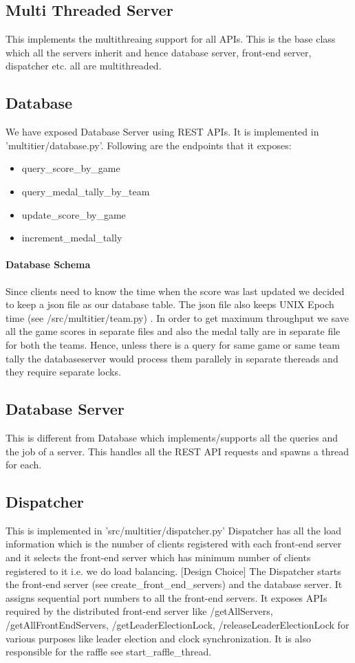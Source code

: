 \documentclass{article}
\begin{document}
\subsection{Multi Threaded Server}
This implements the multithreaing support for all APIs. This is the base class which all the servers inherit and hence database server, front-end server, dispatcher etc. all are multithreaded.

\subsection{Database}
We have exposed Database Server using REST APIs. 
It is implemented in 'multitier/database.py'.
Following are the endpoints that it exposes:
\begin{itemize}
\item query\_score\_by\_game
\item query\_medal\_tally\_by\_team
\item update\_score\_by\_game
\item increment\_medal\_tally
\end{itemize}

\paragraph{Database Schema}
Since clients need to know the time when the score was last updated we 
decided to keep a json file as our database table. The json file also keeps
UNIX Epoch time (see /src/multitier/team.py) . In order to get  maximum throughput we save all the game scores in separate files and also the medal tally are in separate file for both the teams. Hence, unless there is a query for same game or same team tally the databaseserver would process them parallely in separate thereads and they require separate locks.


\subsection{Database Server}
This is different from Database which implements/supports all the queries and the job of a server. This handles all the REST API requests and spawns a thread for each.

\subsection{Dispatcher}
This is implemented in 'src/multitier/dispatcher.py' Dispatcher has all the load information which is the number of clients registered with each front-end server and it selects the front-end server which has minimum number of clients registered to it i.e. we do load balancing. [Design Choice] The Dispatcher starts the front-end server (see create\_front\_end\_servers) and the database server. It assigns sequential port numbers to all the front-end servers. It exposes APIs required by the distributed front-end server like /getAllServers, /getAllFrontEndServers, /getLeaderElectionLock, /releaseLeaderElectionLock for various purposes like leader election and clock synchronization. 
It is also responsible for the raffle see start\_raffle\_thread.
\end{document}
